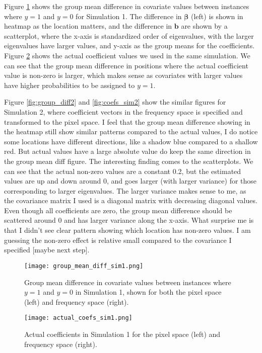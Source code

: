 \documentclass[12pt]{article}
\begin{document}
Figure \ref{fig:group_diff1} shows the group mean difference in covariate values between instances where \( y = 1 \) and \( y = 0 \) for Simulation 1. The difference in \( \boldsymbol{\beta} \) (left) is shown in heatmap as the location matters, and the difference in \( \mathbf{b} \) are shown by a scatterplot, where the x-axis is standardized order of eigenvalues, with the larger eigenvalues have larger values, and y-axis as the group means for the coefficients. Figure \ref{fig:coefs_sim1} shows the actual coefficient values we used in the same simulation. We can see that the group mean difference in positions where the actual coefficient value is non-zero is larger, which makes sense as covariates with larger values have higher probabilities to be assigned to \( y = 1 \).

Figure \ref{fig:group_diff2} and \ref{fig:coefs_sim2} show the similar figures for Simulation 2, where coefficient vectors in the frequency space is specified and transformed to the pixel space. I feel that the group mean difference showing in the heatmap still show similar patterns compared to the actual values, I do notice some locations have different directions, like a shadow blue compared to a shallow red. But actual values have a large absolute value do keep the same direction in the group mean diff figure. The interesting finding comes to the scatterplots. We can see that the actual non-zero values are a constant 0.2, but the estimated values are up and down around 0, and goes larger (with larger variance) for those corresponding to larger eigenvalues. The larger variance makes sense to me, as the covariance matrix I used is a diagonal matrix with decreasing diagonal values. Even though all coefficients are zero, the group mean difference should be scattered around 0 and has larger variance along the x-axis. What surprise me is that I didn't see clear pattern showing which location has non-zero values. I am guessing the non-zero effect is relative small compared to the covariance I specified [maybe next step].

\begin{figure}[h!]
	\centering
  \texttt{[image: group\_mean\_diff\_sim1.png]}
	\caption{Group mean difference in covariate values between instances where \( y = 1 \) and \( y = 0 \) in Simulation
		1, shown for both the pixel space (left) and frequency space (right).}
	\label{fig:group_diff1}
\end{figure}

\begin{figure}[h!]
	\centering
	\texttt{[image: actual\_coefs\_sim1.png]}
	\caption{Actual coefficients in Simulation 1 for the pixel space (left) and frequency space (right).}
	\label{fig:coefs_sim1}
\end{figure}
\end{document}
